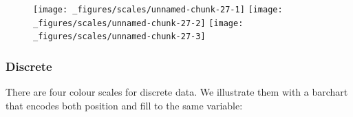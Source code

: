 \begin{figure}[H]
  \texttt{[image: \_figures/scales/unnamed-chunk-27-1]}%
  \texttt{[image: \_figures/scales/unnamed-chunk-27-2]}%
  \texttt{[image: \_figures/scales/unnamed-chunk-27-3]}
\end{figure}

\subsubsection{Discrete}\label{ssub:colour-discrete}

There are four colour scales for discrete data. We illustrate them with
a barchart that encodes both position and fill to the same variable:

\begin{Shaded}
\begin{Highlighting}[]
\StringTok{ }\NormalTok{(} \NormalTok{(}\NormalTok{, }\NormalTok{, }\NormalTok{, }\NormalTok{), } \NormalTok{(}\NormalTok{, }\NormalTok{, }\NormalTok{, }\NormalTok{))}
\StringTok{ } \StringTok{ }
\StringTok{  }\NormalTok{(} \NormalTok{) +}\StringTok{ }
\StringTok{  }\NormalTok{(} \NormalTok{, } \NormalTok{) +}
\StringTok{  }\NormalTok{(} \NormalTok{)}
\end{Highlighting}
\end{Shaded}

